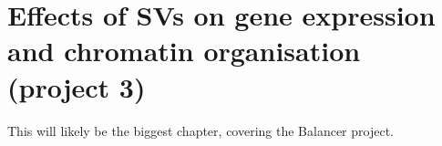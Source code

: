 \chapter{Effects of SVs on gene expression and chromatin organisation (project 3)}

This will likely be the biggest chapter, covering the Balancer project.
